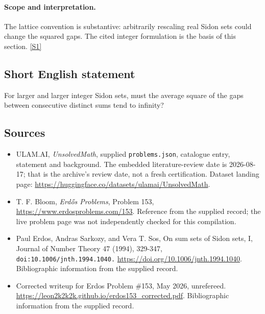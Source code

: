 \documentclass[11pt,a4paper]{article}
\newcommand{\sref}[2]{\hyperlink{source:#1:#2}{[S#2]}}
\begin{document}
\paragraph{Scope and interpretation.}

The lattice convention is substantive: arbitrarily rescaling real Sidon sets could change the squared gaps. The cited integer formulation is the basis of this section. \sref{statement}{1}

\subsection{Short English statement}

For larger and larger integer Sidon sets, must the average square of the gaps between consecutive distinct sums tend to infinity?

\subsection{Sources}

{\small

\begin{itemize}

\item[\hypertarget{source:statement:1}{S1}] ULAM.AI, \emph{UnsolvedMath}, supplied \texttt{problems.json}, catalogue entry, statement and background. The embedded literature-review date is 2026-08-17; that is the archive’s review date, not a fresh certification. Dataset landing page: \url{https://huggingface.co/datasets/ulamai/UnsolvedMath}.

\item[\hypertarget{source:statement:2}{S2}] T. F. Bloom, \emph{Erdős Problems}, Problem 153, \url{https://www.erdosproblems.com/153}. Reference from the supplied record; the live problem page was not independently checked for this compilation.

\item[\hypertarget{source:statement:3}{S3}] Paul Erdos, Andras Sarkozy, and Vera T. Sos, On sum sets of Sidon sets, I, Journal of Number Theory 47 (1994), 329-347, \nolinkurl{doi:10.1006/jnth.1994.1040.} \url{https://doi.org/10.1006/jnth.1994.1040}. Bibliographic information from the supplied record.

\item[\hypertarget{source:statement:4}{S4}] Corrected writeup for Erdos Problem \#153, May 2026, unrefereed. \url{https://leon2k2k2k.github.io/erdos153_corrected.pdf}. Bibliographic information from the supplied record.

\end{itemize}

}

\label{end:statement}
\end{document}
